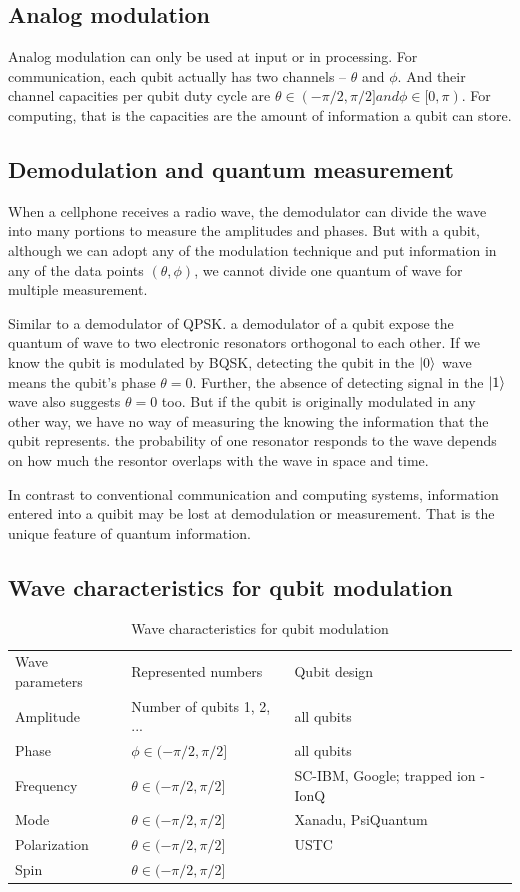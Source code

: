 \documentclass[Letter,11pt]{book}
\begin{document}
\subsection{Analog modulation}
Analog modulation can only be used at input or in processing. For communication, each qubit actually has two channels -- $\theta$ and $\phi$. And their channel capacities per qubit duty cycle are $\theta \in (-\pi/2, \pi/2] and \phi \in [0, \pi)$. For computing, that is the capacities are the amount of information a qubit can store.

\subsection{Demodulation and quantum measurement}
When a cellphone receives a radio wave, the demodulator can divide the wave into many portions to measure the amplitudes and phases. But with a qubit, although we can adopt any of the modulation technique and put information in any of the data points $(\theta, \phi)$, we cannot divide one quantum of wave for multiple measurement.

Similar to a demodulator of QPSK. a demodulator of a qubit expose the quantum of wave to two electronic resonators orthogonal to each other.  If we know the qubit is modulated by BQSK, detecting the qubit in the $\vert {0} \rangle_{}$ wave means the qubit's phase $\theta = 0$. Further, the absence of detecting signal in the $\vert {1} \rangle_{}$ wave also suggests $\theta = 0$ too. But if the qubit is originally modulated in any other way, we have no way of measuring the knowing the information that the qubit represents. the probability of one resonator responds to the wave depends on how much the resontor overlaps with the wave in space and time.

In contrast to conventional communication and computing systems, information entered into a quibit may be lost at demodulation or measurement. That is the unique feature of quantum information.

\subsection{Wave characteristics for qubit modulation}
\begin{table}[]
\caption{Wave characteristics for qubit modulation}
\label{modulation-characteristics}
\begin{tabular}{lll}
Wave parameters &Represented numbers &Qubit design   \\
Amplitude & Number of qubits 1, 2, ... & all qubits \\
Phase & $\phi \in (-\pi /2, \pi /2] $& all qubits \\
Frequency & $\theta \in (-\pi /2, \pi /2]$ & SC-IBM, Google; trapped ion - IonQ \\
Mode & $\theta \in (-\pi /2, \pi /2]$ & Xanadu, PsiQuantum \\
Polarization & $\theta \in (-\pi /2, \pi /2]$ & USTC \\
Spin & $\theta \in (-\pi /2, \pi /2]$ & 
\end{tabular}
\end{table}
\end{document}
